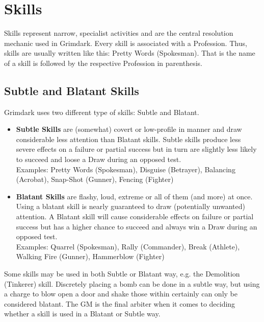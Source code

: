 
\section{Skills}%
\label{sec:skills}
Skills represent narrow, specialist activities and are the central resolution mechanic used in Grimdark. 
Every skill is associated with a Profession.
Thus, skills are usually written like this: Pretty Words (Spokesman).
That is the name of a skill is followed by the respective Profession in parenthesis.

\subsection{Subtle and Blatant Skills}
\label{skill_types}
Grimdark uses two different type of skills: Subtle and Blatant.
\begin{itemize}
	\item \textbf{Subtle Skills} are (somewhat) covert or low-profile in manner and draw considerable less attention than Blatant skills. 
	Subtle skills produce less severe effects on a failure or partial success but in turn are slightly less likely to succeed and loose a Draw during an opposed test.\\
	Examples: Pretty Words (Spokesman), Disguise (Betrayer), Balancing (Acrobat), Snap-Shot (Gunner), Fencing (Fighter)

	\item \textbf{Blatant Skills} are flashy, loud, extreme or all of them (and more) at once. 
	Using a blatant skill is nearly guaranteed to draw (potentially unwanted) attention.
	A Blatant skill will cause considerable effects on failure or partial success but has a higher chance to succeed and always win a Draw during an opposed test.\\
	Examples: Quarrel (Spokesman), Rally (Commander), Break (Athlete), Walking Fire (Gunner), Hammerblow (Fighter)
\end{itemize}
Some skills may be used in both Subtle or Blatant way, e.g. the Demolition (Tinkerer) skill. 
Discretely placing a bomb can be done in a subtle way, but using a charge to blow open a door and shake those within certainly can only be considered blatant.
The GM is the final arbiter when it comes to deciding whether a skill is used in a Blatant or Subtle way.
